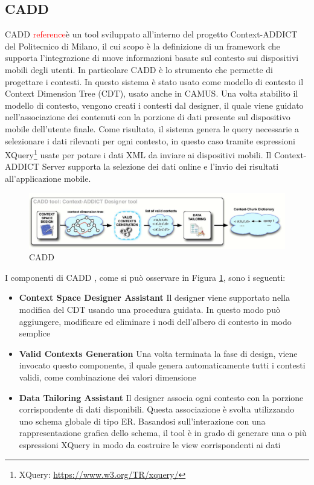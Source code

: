 \subsection*{CADD}

CADD \textcolor{red}{reference}è un tool sviluppato all'interno del progetto Context-ADDICT del Politecnico di Milano, il cui scopo è la definizione di un framework che supporta l'integrazione di nuove informazioni basate sul contesto sui dispositivi mobili degli utenti. In particolare CADD è lo strumento che permette di progettare i contesti. In questo sistema è stato usato come modello di contesto il Context Dimension Tree (CDT), usato anche in CAMUS.  Una volta stabilito il modello di contesto, vengono creati i contesti dal designer, il quale viene guidato nell'associazione dei contenuti con la porzione di dati presente sul dispositivo mobile dell'utente finale. Come risultato, il sistema genera le query necessarie a selezionare i dati rilevanti per ogni contesto, in questo caso tramite espressioni XQuery\footnote{XQuery: \url{https://www.w3.org/TR/xquery/}} usate per potare i dati XML da inviare ai dispositivi mobili.
Il Context-ADDICT Server supporta la selezione dei dati online e l'invio dei risultati all'applicazione mobile. 

\begin{figure}[ht]
	\centering
	\includegraphics[width=\textwidth]{2-nozioni-preliminari/Immagini/cadd.png}
	\caption{CADD}\label{fig:cadd}
\end{figure}
I componenti di CADD , come si può osservare in Figura  \ref{fig:cadd}, sono i seguenti:  
\begin{itemize}
	\item \textbf{Context Space Designer Assistant} Il designer viene supportato nella modifica del CDT usando una procedura guidata. In questo modo può aggiungere, modificare ed eliminare i nodi dell'albero di contesto in modo semplice
	\item \textbf{Valid Contexts Generation}
	Una volta terminata la fase di design, viene invocato questo componente, il quale genera automaticamente tutti i contesti validi, come combinazione dei valori dimensione
	\item \textbf{Data Tailoring Assistant}
	Il designer associa ogni contesto con la porzione corrispondente di dati disponibili. Questa associazione è svolta utilizzando uno schema globale di tipo ER. Basandosi sull'interazione con una rappresentazione grafica dello schema, il tool è in grado di generare una o più espressioni XQuery in modo da costruire le view corrispondenti ai dati
\end{itemize}